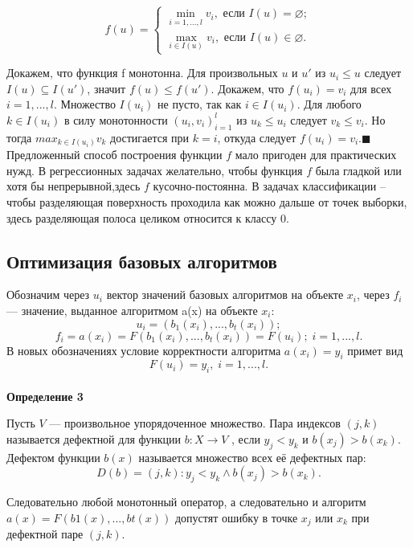 \begin{equation*}
    f(u) =
    \begin{cases}
        \min\limits_{i=1,...,l}v_i, \text{ если } I(u) = \varnothing; \\
        \max\limits_{i\in I(u)}v_i, \text{ если } I(u) \in \varnothing .
    \end{cases}
\end{equation*}


Докажем, что функция f монотонна. Для произвольных $u$ и $u\prime $ из $u_i \leq u$ следует $I(u)\subseteq I( u\prime)$, значит $f(u)\leq f(u\prime )$.
Докажем, что $f(u_i) = v_i$ для всех $i = 1, . . . , l$. Множество $I(u_i)$ не пусто, так
как $i \in I(u_i)$. Для любого $k \in I(u_i)$ в силу монотонности $(u_i, v_i)^l_{i=1}$ из $u_k \leq u_i$ следует $v_k \leq v_i$. Но тогда $max_{k\in I(u_i)} v_k$ достигается при $k = i$, откуда следует $f(u_i) = v_i$.$\blacksquare$\\




Предложенный способ построения функции $f$ мало пригоден для практических нужд.
 В регрессионных задачах желательно, чтобы функция $f$ была гладкой или хотя бы непрерывной,здесь  $f$ кусочно-постоянна. В задачах классификации  -- чтобы разделяющая поверхность проходила как можно дальше от точек выборки, здесь разделяющая полоса целиком относится к классу 0.


\subsection{Оптимизация базовых алгоритмов}

Обозначим через $u_i$ вектор значений базовых алгоритмов на объекте $x_i$, через $f_i$ — значение, выданное алгоритмом a(x) на объекте $x_i$:
\[u_i = (b_1(x_i), . . . , b_t(x_i));\]
\[f_i = a(x_i) = F(b_1(x_i), . . . , b_t(x_i)) = F(u_i); \; i = 1, . . . , l.\]
В новых обозначениях условие корректности алгоритма $a(x_i) = y_i$ примет вид
\[F(u_i) = y_i
, \; i = 1, . . . , l. 
\]\\

\textbf{Определение 3} 

Пусть $V$ — произвольное упорядоченное множество. Пара индексов $(j, k)$
называется дефектной для функции $b : X \rightarrow V$ , если $y_j < y_k$ и $b(x_j ) > b(x_k)$. Дефектом функции $b(x)$ называется множество всех её дефектных пар:
\[D(b) = {(j, k): y_j < y_k \wedge b(x_j ) > b(x_k)} .\]


Следовательно любой монотонный оператор, а следовательно и алгоритм $a(x) = F(b1(x), . . . , bt(x)) $ допустят ошибку в точке $x_j$ или $x_k$ при дефектной паре $(j, k)$.
\\

